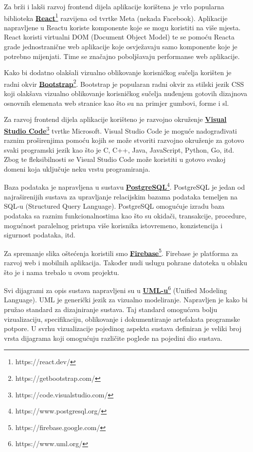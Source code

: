 			Za brži i lakši razvoj frontend dijela aplikacije korištena je vrlo popularna biblioteka  \href{https://react.dev/}{\textbf{React}}\footnote{https://react.dev/} razvijena od tvrtke Meta (nekada Facebook). Aplikacije napravljene u Reactu koriste komponente koje se mogu koristiti na više mjesta. React koristi virtualni DOM (Document Object Model) te se pomoću Reacta grade jednostranične web aplikacije koje osvježavaju samo komponente koje je potrebno mijenjati. Time se značajno poboljšavaju performanse web aplikacije.
			
			Kako bi dodatno olakšali vizualno oblikovanje korisničkog sučelja korišten je radni okvir \href{https://getbootstrap.com/}{\textbf{Bootstrap}}\footnote{https://getbootstrap.com/}. Bootstrap je popularan radni okvir za stilski jezik CSS koji olakšava vizualno oblikovanje korisničkog sučelja nuđenjem gotovih dizajnova osnovnih elemenata web stranice kao što su na primjer gumbovi, forme i sl. 
			
			Za razvoj frontend dijela aplikacije korišteno je razvojno okruženje \href{https://code.visualstudio.com/}{\textbf{Visual Studio Code}}\footnote{https://code.visualstudio.com/} tvrtke Microsoft. Visual Studio Code je moguće nadograđivati raznim proširenjima pomoću kojih se može stvoriti razvojno okruženje za gotovo svaki programski jezik kao što je C, C++, Java, JavaScript, Python, Go, itd. Zbog te fleksibilnosti se Visual Studio Code može koristiti u gotovo svakoj domeni koja uključuje neku vrstu programiranja.
			
			Baza podataka je napravljena u sustavu \href{https://www.postgresql.org/}{\textbf{PostgreSQL}}\footnote{https://www.postgresql.org/}. PostgreSQL je jedan od najraširenijih sustava za upravljanje relacijskim bazama podataka temeljen na SQL-u (Structured Query Language). PostgreSQL omogućuje izradu baza podataka sa raznim funkcionalnostima kao što su okidači, transakcije, procedure, mogućnost paralelnog pristupa više korisnika istovremeno, konzistencija i sigurnost podataka, itd.
			
			Za spremanje slika oštećenja koristili smo \href{https://firebase.google.com/}{\textbf{Firebase}}\footnote{https://firebase.google.com/}. Firebase je platforma za razvoj web i mobilnih aplikacija. Također nudi uslugu pohrane datoteka u oblaku što je i nama trebalo u ovom projektu.
			
			Svi dijagrami za opis sustava napravljeni su u \href{https://www.uml.org/}{\textbf{UML-u}}\footnote{https://www.uml.org/} (Unified Modeling Language). UML je generički jezik za vizualno modeliranje. Napravljen je kako bi pružao standard za dizajniranje sustava. Taj standard omogućava bolju vizualizaciju, specifikaciju, oblikovanje i dokumentiranje artefakata programske potpore. U svrhu vizualizacije pojedinog aspekta sustava definiran je veliki broj vrsta dijagrama koji omogućuju različite poglede na pojedini dio sustava.
			
